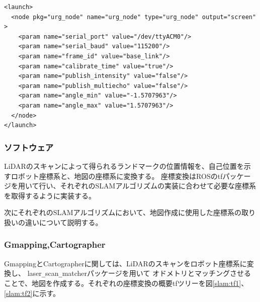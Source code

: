 \begin{lrbox}{\mybox}
  \begin{lstlisting}[caption=LiDARによる点群取得の実行ファイル,label=slam:s1]
<launch>
  <node pkg="urg_node" name="urg_node" type="urg_node" output="screen" >
    <param name="serial_port" value="/dev/ttyACM0"/>
    <param name="serial_baud" value="115200"/>
    <param name="frame_id" value="base_link"/>
    <param name="calibrate_time" value="true"/>
    <param name="publish_intensity" value="false"/>
    <param name="publish_multiecho" value="false"/>
    <param name="angle_min" value="-1.5707963"/>
    <param name="angle_max" value="1.5707963"/>
  </node>
</launch>
  \end{lstlisting}
\end{lrbox}
\scalebox{.9}{\usebox{\mybox}}

\subsubsection{ソフトウェア}
LiDARのスキャンによって得られるランドマークの位置情報を、自己位置を示すロボット座標系と、地図の座標系に変換する。
座標変換はROSのtf\cite{slam:tf}パッケージを用いて行い、それぞれのSLAMアルゴリズムの実装に合わせて必要な座標系を取得するように実装する。

次にそれぞれのSLAMアルゴリズムにおいて、地図作成に使用した座標系の取り扱いの違いについて説明する。

\subsubsection{Gmapping,Cartographer}
GmappingとCartographerに関しては、LiDARのスキャンをロボット座標系に変換し、
laser\verb|_|scan\verb|_|matcher\cite{slam:laser}パッケージを用いて
オドメトリとマッチングさせることで、地図を作成する。それぞれの座標変換の概要tfツリーを図\ref{slam:tf1}、\ref{slam:tf2}に示す。

